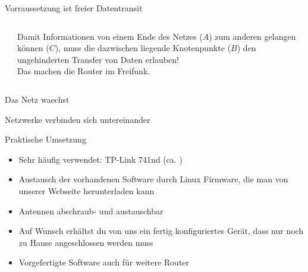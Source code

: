 \documentclass[aspectratio=43]{beamer}
\begin{document}
\begin{frame}{Vorraussetzung ist freier Datentransit} %
	\begin{columns}[c]
		\begin{column}[c]{.4\textwidth}
		\end{column}
		\begin{column}[c]{.6\textwidth}
			Damit Informationen von einem Ende des Netzes ($A$) zum anderen gelangen können ($C$), muss die dazwischen liegende Knotenpunkte ($B$) den ungehinderten Transfer von Daten erlauben!\\
			Das machen die Router im Freifunk.
		\end{column}
	\end{columns}
	\end{frame}

\begin{frame}{Das Netz waechst}

\end{frame}

\begin{frame}{Netzwerke verbinden sich untereinander}

\end{frame}

\begin{frame}{Praktische Umsetzung}
	\begin{itemize}
		\item Sehr häufig verwendet: TP-Link 741nd (ca. )
		\item Austausch der vorhandenen Software durch Linux Firmware, die man von unserer Webseite herunterladen kann
		\item Antennen abschraub- und austauschbar
		\item Auf Wunsch erhältst du von uns ein fertig konfiguriertes Gerät, dass nur noch zu Hause angeschlossen werden muss
		\item Vorgefertigte Software auch für weitere Router
	\end{itemize}
\end{frame}
\end{document}

